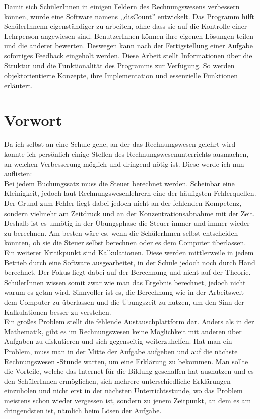 \documentclass[12pt]{report}
\begin{document}
\noindent Damit sich SchülerInnen in einigen Feldern des Rechnungswesens verbessern können, wurde eine Software namens ,,disCount'' entwickelt. Das Programm hilft SchülerInnenn eigenständiger zu arbeiten, ohne dass sie auf die Kontrolle einer Lehrperson angewiesen sind. BenutzerInnen können ihre eigenen Lösungen teilen und die anderer bewerten. Deswegen kann nach der Fertigstellung einer Aufgabe sofortiges Feedback eingeholt werden. Diese Arbeit stellt Informationen über die Struktur und die Funktionalität des Programms zur Verfügung. So werden objektorientierte Konzepte, ihre Implementation und essenzielle Funktionen erläutert.

\newpage
  
\section*{Vorwort} 
  
Da ich selbst an eine Schule gehe, an der das Rechnungswesen gelehrt wird konnte ich persönlich einige Stellen des Rechnungswesenunterrichts ausmachen, an welchen Verbesserung möglich und dringend nötig ist. Diese werde ich nun auflisten:\\

\noindent Bei jedem Buchungssatz muss die Steuer berechnet werden. Scheinbar eine Kleinigkeit, jedoch laut Rechnungswesenlehrern eine der häufigsten Fehlerquellen. Der Grund zum Fehler liegt dabei jedoch nicht an der fehlenden Kompetenz, sondern vielmehr am Zeitdruck und an der Konzentrationsabnahme mit der Zeit. Deshalb ist es unnötig in der Übungsphase die Steuer immer und immer wieder zu berechnen. Am besten wäre es, wenn die SchülerInnen selbst entscheiden könnten, ob sie die Steuer selbst berechnen oder es dem Computer überlassen.\\

\noindent Ein weiterer Kritikpunkt sind Kalkulationen. Diese werden mittlerweile in jedem Betrieb durch eine Software ausgearbeitet, in der Schule jedoch noch durch Hand berechnet. Der Fokus liegt dabei auf der Berechnung und nicht auf der Theorie. SchülerInnen wissen somit zwar wie man das Ergebnis berechnet, jedoch nicht warum es getan wird. Sinnvoller ist es, die Berechnung wie in der Arbeitswelt dem Computer zu überlassen und die Übungszeit zu nutzen, um den Sinn der Kalkulationen besser zu verstehen.\\

\noindent Ein großes Problem stellt die fehlende Austauschplattform dar. Anders als in der Mathematik, gibt es im Rechnungswesen keine Möglichkeit mit anderen über Aufgaben zu diskutieren und sich gegenseitig weiterzuhelfen. Hat man ein Problem, muss man in der Mitte der Aufgabe aufgeben und auf die nächste Rechnungswesen -Stunde warten, um eine Erklärung zu bekommen. Man sollte die Vorteile, welche das Internet für die Bildung geschaffen hat ausnutzen und es den SchülerInnen ermöglichen, sich mehrere unterschiedliche Erklärungen einzuholen und nicht erst in der nächsten Unterrichtsstunde, wo das Problem meistens schon wieder vergessen ist, sondern zu jenem Zeitpunkt, an dem es am dringendsten ist, nämlich beim Lösen der Aufgabe.\\
\end{document}
